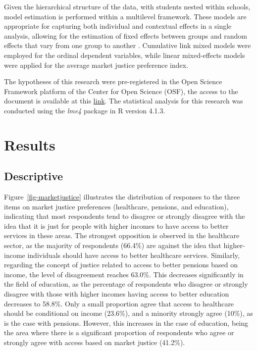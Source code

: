 \documentclass[
    behavsci,
    article,
    submit,
moreauthors
]{mdpi}
\begin{document}
Given the hierarchical structure of the data, with students nested
within schools, model estimation is performed within a multilevel
framework. These models are appropriate for capturing both individual
and contextual effects in a single analysis, allowing for the estimation
of fixed effects between groups and random effects that vary from one
group to another \citep{bell_fixed_2019, hox_multilevel_2010}.
Cumulative link mixed models were employed for the ordinal dependent
variables, while linear mixed-effects models were applied for the
average market justice preference index.

The hypotheses of this research were pre-registered in the Open Science
Framework platform of the Center for Open Science (OSF), the access to
the document is available at this
\href{https://doi.org/10.17605/OSF.IO/UFSDV}{link}. The statistical
analysis for this research was conducted using the \emph{lme4} package
in R version 4.1.3.

\section{Results}\label{results}

\subsection{Descriptive}\label{descriptive}

Figure~\ref{fig-marketjustice} illustrates the distribution of responses
to the three items on market justice preferences (healthcare, pensions,
and education), indicating that most respondents tend to disagree or
strongly disagree with the idea that it is just for people with higher
incomes to have access to better services in these areas. The strongest
opposition is observed in the healthcare sector, as the majority of
respondents (66.4\%) are against the idea that higher-income individuals
should have access to better healthcare services. Similarly, regarding
the concept of justice related to access to better pensions based on
income, the level of disagreement reaches 63.0\%. This decreases
significantly in the field of education, as the percentage of
respondents who disagree or strongly disagree with those with higher
incomes having access to better education decreases to 58.8\%. Only a
small proportion agree that access to healthcare should be conditional
on income (23.6\%), and a minority strongly agree (10\%), as is the case
with pensions. However, this increases in the case of education, being
the area where there is a significant proportion of respondents who
agree or strongly agree with access based on market justice (41.2\%).
\end{document}
